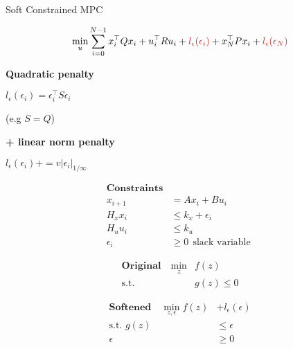\begin{sstTitleBox}{
		Soft Constrained MPC
	}

	\begin{sstOnlyFrame}
		\begin{equation}
			\min_u\sum_{i=0}^{N-1}
			x_i^\top Q x_i + u_i^\top R u_i
			+\color{BrickRed}l_\epsilon(\epsilon_i)\color{black}
			+x_N^\top P x_i
			+\color{BrickRed}l_\epsilon(\epsilon_N)
		\end{equation}

		\vspace{-7mm}
		\begin{minipage}[b]{0.45\linewidth}
			\textbf{Quadratic penalty}

			$l_\epsilon(\epsilon_i) = \epsilon_i^\top S \epsilon_i$

			\quad			(e.g $S = Q$)

			\textbf{+ linear norm penalty}

			$l_\epsilon(\epsilon_i) +=
				v|\epsilon_i|_{1/\infty}$
		\end{minipage}
		\begin{minipage}[b]{0.54\linewidth}
			\begin{align*}
				\textbf{Constraints}
				\\
				x_{i+1}    & =Ax_i + Bu_i       \\
				H_xx_i     & \le k_x+\epsilon_i \\
				H_uu_i     & \le k_u            \\
				\epsilon_i & \ge0
				\ \
				\text{slack variable }
			\end{align*}
		\end{minipage}
	\end{sstOnlyFrame}
	\begin{sstOnlyFrame}
		\begin{minipage}[t]{0.44\linewidth}
			\begin{align*}
				\textbf{Original}
				\quad
				\min_z       & f(z)     \\
				\text{s.t. } & g(z)\le0
			\end{align*}
		\end{minipage}
		\begin{minipage}[t]{0.55\linewidth}
			\begin{align*}
				\textbf{Softened}
				\quad
				\min_{z,\epsilon}  f(z) & +l_\epsilon(\epsilon) \\
				\text{s.t. }       g(z) & \le \epsilon          \\
				\epsilon                & \ge0
			\end{align*}
		\end{minipage}
	\end{sstOnlyFrame}
\end{sstTitleBox}



